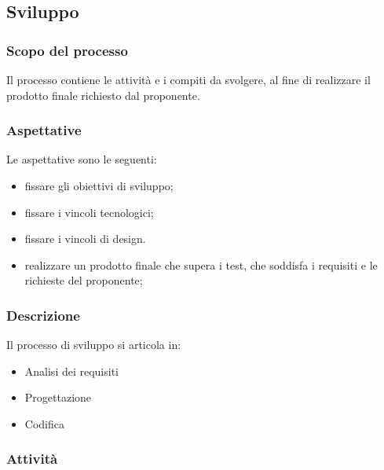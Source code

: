 \subsection{Sviluppo}
	\subsubsection{Scopo del processo}
	Il processo contiene le attività e i compiti da svolgere, al fine di realizzare il prodotto finale richiesto dal proponente.
	\subsubsection{Aspettative}
	Le aspettative sono le seguenti:
	\begin{itemize}
		\item fissare gli obiettivi di sviluppo;
		\item fissare i vincoli tecnologici;
		\item fissare i vincoli di design.
		\item realizzare un prodotto finale che supera i test, che soddisfa i requisiti e le richieste del proponente;
	\end{itemize}
	\subsubsection{Descrizione}
	Il processo di sviluppo si articola in:
	\begin{itemize}
		\item Analisi dei requisiti
		\item Progettazione
		\item Codifica	
	\end{itemize}
	\subsubsection{Attività}

